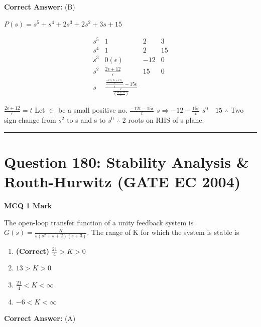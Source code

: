\documentclass[11pt,a4paper]{article}
\begin{document}
\noindent \textbf{Correct Answer:} (B)

\begin{tcolorbox}[solbox, title=Detailed Solution -- Question 179]
$P(s)=s^{5}+s^{4}+2 s^{3}+2 s^{2}+3 s+15$

\[
\begin{array}{c|ccc} s^{5}& 1 & 2 & 3 \\ s^{4} & 1 & 2 & 15 \\ s^{3} & 0(\epsilon) & -12 & 0 \\ s^{2} & \frac{2 \epsilon+12}{\epsilon} & 15 & 0 \\ s&\frac{\frac{\frac{-12(2 \epsilon+12)}{\epsilon}}{\epsilon }-15 \epsilon }{\frac{\epsilon}{\left(\frac{2 \epsilon+12}{\epsilon}\right)}}&& \end{array}
\]

$\frac{2 \epsilon+12}{\epsilon}=t$
 Let $\in$ be a small positive no. 
$\frac{-12 t-15 \epsilon}{t}$
$s \Rightarrow-12-\frac{15 \epsilon}{t}$
$s ^{0}\quad 15$
$\therefore$ Two sign change from $s^{2}$ to s and s to $s^{0}$
$\therefore$ 2 roots on RHS of s plane.
\end{tcolorbox}

\vspace{1.5em}
\hrule
\vspace{1.5em}

\section*{Question 180: Stability Analysis \& Routh-Hurwitz (GATE EC 2004)}
\noindent \textbf{\color{primary}MCQ} \hfill \textbf{\color{secondary}1 Mark}


\noindent The open-loop transfer function of a unity feedback system is $G(s)=\frac{K}{s(s^{2}+s+2)(s+3)}$. The range of K for which the system is stable is


\begin{enumerate}[label=(\Alph*)]
    \item \textbf{(Correct)} $\frac{21}{4} > K > 0$
    \item $13 > K > 0$
    \item $\frac{21}{4} < K < \infty$
    \item $-6 < K < \infty$
\end{enumerate}

\noindent \textbf{Correct Answer:} (A)
\end{document}
